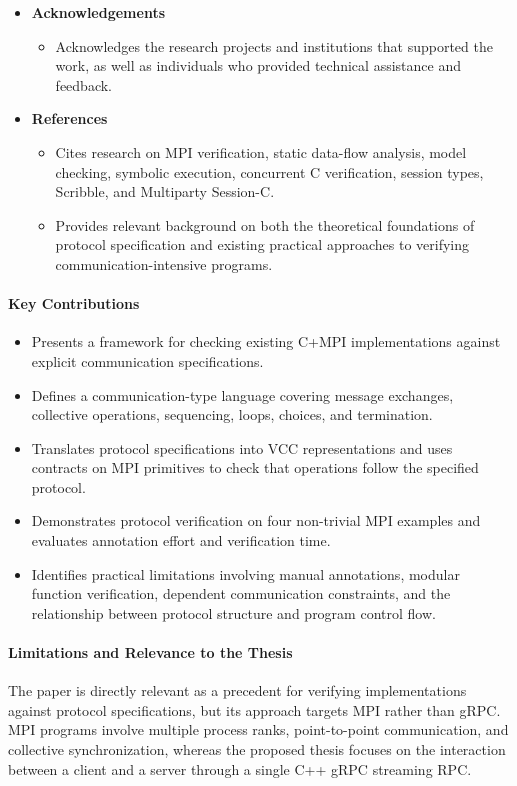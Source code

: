 \begin{itemize}
    \item \textbf{Acknowledgements}
    \begin{itemize}
        \item Acknowledges the research projects and institutions that supported the work, as well as individuals who provided technical assistance and feedback.
    \end{itemize}

    \item \textbf{References}
    \begin{itemize}
        \item Cites research on MPI verification, static data-flow analysis, model checking, symbolic execution, concurrent C verification, session types, Scribble, and Multiparty Session-C.
        \item Provides relevant background on both the theoretical foundations of protocol specification and existing practical approaches to verifying communication-intensive programs.
    \end{itemize}
\end{itemize}

\paragraph{Key Contributions}
\begin{itemize}
    \item Presents a framework for checking existing C+MPI implementations against explicit communication specifications.
    \item Defines a communication-type language covering message exchanges, collective operations, sequencing, loops, choices, and termination.
    \item Translates protocol specifications into VCC representations and uses contracts on MPI primitives to check that operations follow the specified protocol.
    \item Demonstrates protocol verification on four non-trivial MPI examples and evaluates annotation effort and verification time.
    \item Identifies practical limitations involving manual annotations, modular function verification, dependent communication constraints, and the relationship between protocol structure and program control flow.
\end{itemize}

\paragraph{Limitations and Relevance to the Thesis}
The paper is directly relevant as a precedent for verifying implementations against protocol specifications, but its approach targets MPI rather than gRPC. MPI programs involve multiple process ranks, point-to-point communication, and collective synchronization, whereas the proposed thesis focuses on the interaction between a client and a server through a single C++ gRPC streaming RPC.

